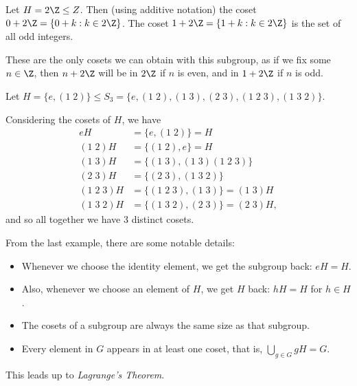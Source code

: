 \documentclass[a4paper]{scrartcl}
\begin{document}
\begin{example}[Cosets of $2\Z$]
Let $H = 2\Z \leq Z$. Then (using additive notation) the coset $0 + 2\Z = \{0 + k : k \in 2\Z\}$. The coset $1 + 2\Z = \{1 + k : k \in 2\Z\}$ is the set of all odd integers.  

These are the only cosets we can obtain with this subgroup, as if we fix some $n \in \Z$, then $n + 2\Z$ will be in $2\Z$ if $n$ is even, and in $1 + 2\Z$ if $n$ is odd.
\end{example}

\begin{example}
	Let $H = \{ e, (1\; 2) \} \leq S_3 = \{e, (1\; 2), (1\; 3), (2\; 3), (1\; 2\; 3), (1\; 3\; 2)\}$.

	Considering the cosets of $H$, we have 
	\begin{align*}
		eH &= \{ e, (1\; 2) \} = H \\
		(1\; 2) H &= \{(1\; 2), e\} = H \\
		(1\; 3) H &= \{ (1\; 3), (1\; 3)(1\; 2\; 3)\} \\
		(2\; 3) H &= \{(2\; 3), (1\; 3\; 2)\}\\
		(1\; 2\; 3) H &= \{ (1\; 2\; 3), (1\; 3)\} = (1\; 3)H\\
		(1\; 3\; 2) H &= \{(1\; 3\; 2), (2\; 3)\} = (2\; 3)H,
	\end{align*}
	and so all together we have 3 distinct cosets.
\end{example}

From the last example, there are some notable details:
\begin{itemize}
	\item Whenever we choose the identity element, we get the subgroup back: $eH = H$.
	\item Also, whenever we choose an element of $H$, we get $H$ back: $h H= H$ for $h \in H$.
	\item The cosets of a subgroup are always the same size as that subgroup.
	\item Every element in $G$ appears in at least one coset, that is, $\displaystyle \bigcup_{g \in G} gH = G$.
\end{itemize}

This leads up to \emph{Lagrange's Theorem}.
\end{document}
